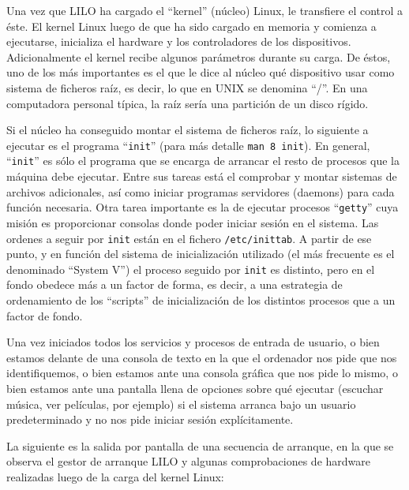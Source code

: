 \documentclass[12pt]{article}
\begin{document}
Una vez que LILO ha cargado el ``kernel'' (núcleo) Linux, le transfiere el control a éste.
El kernel Linux luego de que ha sido cargado en memoria y comienza a
ejecutarse, inicializa el hardware y los controladores de los dispositivos. 
Adicionalmente el kernel recibe algunos parámetros durante su carga. De éstos, 
uno de los más importantes es el que le dice al núcleo qué dispositivo usar 
como sistema de ficheros raíz, es decir, lo
que en UNIX se denomina ``/''. En una computadora personal típica, la raíz sería
una partición de un disco rígido. 

Si el núcleo ha conseguido montar el sistema de ficheros raíz, lo siguiente a
ejecutar es el programa ``\texttt{init}'' (para más detalle \texttt{man 8 init}). 
En general, ``\texttt{init}'' es sólo el programa que se encarga de arrancar el resto de
procesos que la máquina debe ejecutar. Entre sus tareas está el comprobar y
montar sistemas de archivos adicionales, así como iniciar programas servidores (daemons)
para cada función necesaria. Otra tarea importante es la de ejecutar procesos
``\texttt{getty}'' cuya misión es proporcionar consolas donde poder iniciar sesión en el
sistema. Las ordenes a seguir por \texttt{init} están en el fichero \texttt{/etc/inittab}. 
A partir de
ese punto, y en función del sistema de inicialización utilizado (el más frecuente es
el denominado ``System V'') el proceso seguido por \texttt{init} es distinto, pero en el
fondo obedece más a un factor de forma, es decir, a una estrategia de
ordenamiento de los ``scripts'' de inicialización de los distintos procesos que a un
factor de fondo.

Una vez iniciados todos los servicios y procesos de entrada de usuario, o bien
estamos delante de una consola de texto en la que el ordenador nos pide que nos
identifiquemos, o bien estamos ante una consola gráfica que nos pide lo mismo, o
bien estamos ante una pantalla llena de opciones sobre qué ejecutar (escuchar
música, ver películas, por ejemplo) si el sistema arranca bajo un usuario
predeterminado y no nos pide iniciar sesión explícitamente.

La siguiente es la salida por pantalla de una secuencia de arranque, en 
la que se observa el gestor de arranque LILO y algunas comprobaciones de 
hardware realizadas luego de la carga del kernel Linux: 
\end{document}
